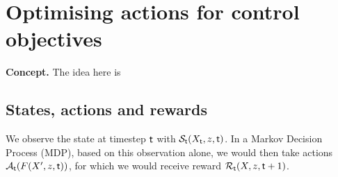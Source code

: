 \chapter{\sffamily Optimising actions for control objectives}

{\bfseries\sffamily Concept.} The idea here is 

\section{\sffamily States, actions and rewards}

We observe the state at timestep ${\sf t}$ with ${\cal S}_{{\sf t}}(X_{{\sf t}}, z, {\sf t})$. In a Markov Decision Process (MDP), based on this observation alone, we would then take actions ${\cal A}_{{\sf t}}(F(X', z, {\sf t}))$, for which we would receive reward ${\cal R}_{{\sf t}}(X, z, {\sf t}+1)$.
